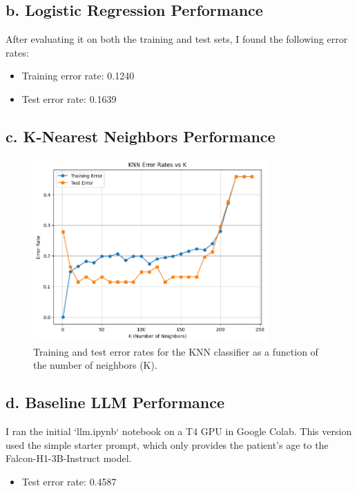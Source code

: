 \documentclass[11pt]{article}
\begin{document}
\subsection*{b. Logistic Regression Performance}

\noindent
After evaluating it on both the training and test sets, I found the following error rates:
\begin{itemize}
    \item Training error rate: 0.1240
    \item Test error rate: 0.1639
\end{itemize}

\subsection*{c. K-Nearest Neighbors Performance}

\noindent
\begin{figure}[h!]
\centering
\includegraphics[width=0.8\textwidth]{img.png}
\caption{Training and test error rates for the KNN classifier as a function of the number of neighbors (K).}
\label{fig:knn}
\end{figure}

\subsection*{d. Baseline LLM Performance}

\noindent
I ran the initial `llm.ipynb` notebook on a T4 GPU in Google Colab. This version used the simple starter prompt, which only provides the patient's age to the Falcon-H1-3B-Instruct model.
\begin{itemize}
    \item Test error rate: 0.4587   
\end{itemize}
\end{document}

